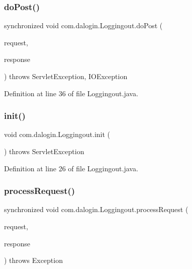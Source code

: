 \mbox{\label{classcom_1_1dalogin_1_1_loggingout_a6136baa87bf33f3405f1560b8261e85b}} 
\subsubsection{\texorpdfstring{do\+Post()}{doPost()}}
{\footnotesize\ttfamily synchronized void com.\+dalogin.\+Loggingout.\+do\+Post (\begin{DoxyParamCaption}\item[{Http\+Servlet\+Request}]{request,  }\item[{Http\+Servlet\+Response}]{response }\end{DoxyParamCaption}) throws Servlet\+Exception, I\+O\+Exception}



Definition at line 36 of file Loggingout.\+java.

\mbox{\label{classcom_1_1dalogin_1_1_loggingout_a6d5de76157cc1cd86ce4584be1770ea0}} 
\subsubsection{\texorpdfstring{init()}{init()}}
{\footnotesize\ttfamily void com.\+dalogin.\+Loggingout.\+init (\begin{DoxyParamCaption}{ }\end{DoxyParamCaption}) throws Servlet\+Exception}



Definition at line 26 of file Loggingout.\+java.

\mbox{\label{classcom_1_1dalogin_1_1_loggingout_a8a2b3425799aff2fe737844345bc48da}} 
\subsubsection{\texorpdfstring{process\+Request()}{processRequest()}}
{\footnotesize\ttfamily synchronized void com.\+dalogin.\+Loggingout.\+process\+Request (\begin{DoxyParamCaption}\item[{Http\+Servlet\+Request}]{request,  }\item[{Http\+Servlet\+Response}]{response }\end{DoxyParamCaption}) throws Exception}



